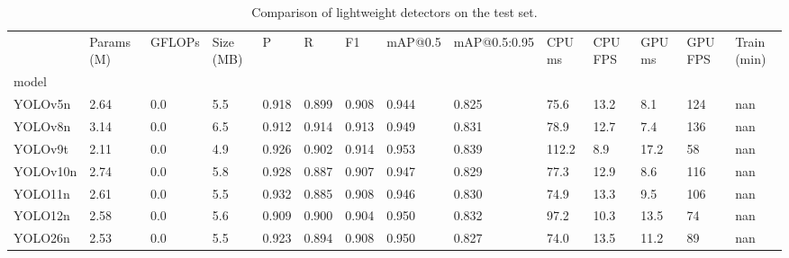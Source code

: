 \begin{table}
\caption{Comparison of lightweight detectors on the test set.}
\label{tab:main}
\begin{tabular}{llllllllllllll}
\toprule
 & Params (M) & GFLOPs & Size (MB) & P & R & F1 & mAP@0.5 & mAP@0.5:0.95 & CPU ms & CPU FPS & GPU ms & GPU FPS & Train (min) \\
model &  &  &  &  &  &  &  &  &  &  &  &  &  \\
\midrule
YOLOv5n & 2.64 & 0.0 & 5.5 & 0.918 & 0.899 & 0.908 & 0.944 & 0.825 & 75.6 & 13.2 & 8.1 & 124 & nan \\
YOLOv8n & 3.14 & 0.0 & 6.5 & 0.912 & 0.914 & 0.913 & 0.949 & 0.831 & 78.9 & 12.7 & 7.4 & 136 & nan \\
YOLOv9t & 2.11 & 0.0 & 4.9 & 0.926 & 0.902 & 0.914 & 0.953 & 0.839 & 112.2 & 8.9 & 17.2 & 58 & nan \\
YOLOv10n & 2.74 & 0.0 & 5.8 & 0.928 & 0.887 & 0.907 & 0.947 & 0.829 & 77.3 & 12.9 & 8.6 & 116 & nan \\
YOLO11n & 2.61 & 0.0 & 5.5 & 0.932 & 0.885 & 0.908 & 0.946 & 0.830 & 74.9 & 13.3 & 9.5 & 106 & nan \\
YOLO12n & 2.58 & 0.0 & 5.6 & 0.909 & 0.900 & 0.904 & 0.950 & 0.832 & 97.2 & 10.3 & 13.5 & 74 & nan \\
YOLO26n & 2.53 & 0.0 & 5.5 & 0.923 & 0.894 & 0.908 & 0.950 & 0.827 & 74.0 & 13.5 & 11.2 & 89 & nan \\
\bottomrule
\end{tabular}
\end{table}
